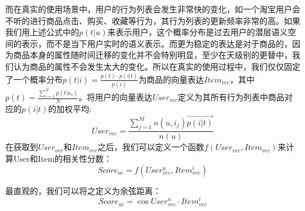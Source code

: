而在真实的使用场景中，用户的行为列表会发生非常快的变化，如一个淘宝用户会不听的进行商品点击、购买、收藏等行为，其行为列表的更新频率非常的高。如果我们用上述公式中的$p(t|u)$来表示用户，这个概率分布是过去用户的潜层语义空间的表示，而不是当下用户实时的语义表示。而更为稳定的表达是对于商品的，因为商品本身的属性随时间迁移的变化并不会特别明显，至少在天级别的更替中，我们认为商品的属性不会发生太大的变化。所以在真实的使用过程中，我们仅仅固定了一个概率分布$p(t|i) = \frac{p(t) \cdot p(i|t)}{p(i)}$为商品的向量表达$Item_{vec}$，其中$p(t) = \frac{\sum_{s=1}^N p(t|u_s)}{N}$。将用户的向量表达$User_{vec}$定义为其所有行为列表中商品对应的$p(i|t)$的加权平均:
\begin{equation}
User_{vec} = \frac{\sum_{j=1}^M n(u,i_j)\overrightarrow {p(i|t)}}{n(u)}
\end{equation}
在获取到$User_{vec}$和$Item_{vec}$之后，我们可以定义一个函数$f(User_{vec}, Item_{vec})$来计算User和Item的相关性分数：
\begin{equation}
Score_{ui} = f(User_{vec}^u, Item_{vec}^i)
\end{equation}

最直观的，我们可以将之定义为余弦距离：
\begin{equation}
Score_{ui} = \cos User_{vec}^u \cdot Item_{vec}^i
\end{equation}

